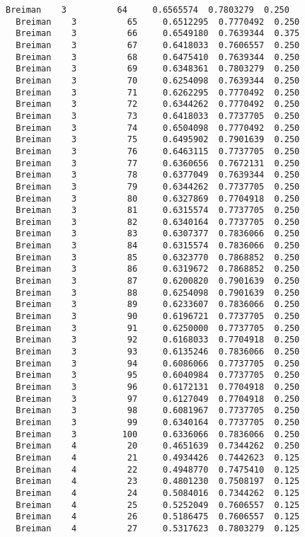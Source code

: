 \documentclass[11pt]{article}
\begin{document}
\begin{Verbatim}[commandchars=\\\{\}]
  Breiman    3          64     0.6565574  0.7803279  0.250
  Breiman    3          65     0.6512295  0.7770492  0.250
  Breiman    3          66     0.6549180  0.7639344  0.375
  Breiman    3          67     0.6418033  0.7606557  0.250
  Breiman    3          68     0.6475410  0.7639344  0.250
  Breiman    3          69     0.6348361  0.7803279  0.250
  Breiman    3          70     0.6254098  0.7639344  0.250
  Breiman    3          71     0.6262295  0.7770492  0.250
  Breiman    3          72     0.6344262  0.7770492  0.250
  Breiman    3          73     0.6418033  0.7737705  0.250
  Breiman    3          74     0.6504098  0.7770492  0.250
  Breiman    3          75     0.6495902  0.7901639  0.250
  Breiman    3          76     0.6463115  0.7737705  0.250
  Breiman    3          77     0.6360656  0.7672131  0.250
  Breiman    3          78     0.6377049  0.7639344  0.250
  Breiman    3          79     0.6344262  0.7737705  0.250
  Breiman    3          80     0.6327869  0.7704918  0.250
  Breiman    3          81     0.6315574  0.7737705  0.250
  Breiman    3          82     0.6340164  0.7737705  0.250
  Breiman    3          83     0.6307377  0.7836066  0.250
  Breiman    3          84     0.6315574  0.7836066  0.250
  Breiman    3          85     0.6323770  0.7868852  0.250
  Breiman    3          86     0.6319672  0.7868852  0.250
  Breiman    3          87     0.6200820  0.7901639  0.250
  Breiman    3          88     0.6254098  0.7901639  0.250
  Breiman    3          89     0.6233607  0.7836066  0.250
  Breiman    3          90     0.6196721  0.7737705  0.250
  Breiman    3          91     0.6250000  0.7737705  0.250
  Breiman    3          92     0.6168033  0.7704918  0.250
  Breiman    3          93     0.6135246  0.7836066  0.250
  Breiman    3          94     0.6086066  0.7737705  0.250
  Breiman    3          95     0.6040984  0.7737705  0.250
  Breiman    3          96     0.6172131  0.7704918  0.250
  Breiman    3          97     0.6127049  0.7704918  0.250
  Breiman    3          98     0.6081967  0.7737705  0.250
  Breiman    3          99     0.6340164  0.7737705  0.250
  Breiman    3         100     0.6336066  0.7836066  0.250
  Breiman    4          20     0.4651639  0.7344262  0.250
  Breiman    4          21     0.4934426  0.7442623  0.125
  Breiman    4          22     0.4948770  0.7475410  0.125
  Breiman    4          23     0.4801230  0.7508197  0.125
  Breiman    4          24     0.5084016  0.7344262  0.125
  Breiman    4          25     0.5252049  0.7606557  0.125
  Breiman    4          26     0.5186475  0.7606557  0.125
  Breiman    4          27     0.5317623  0.7803279  0.125

\end{Verbatim}
\end{document}
